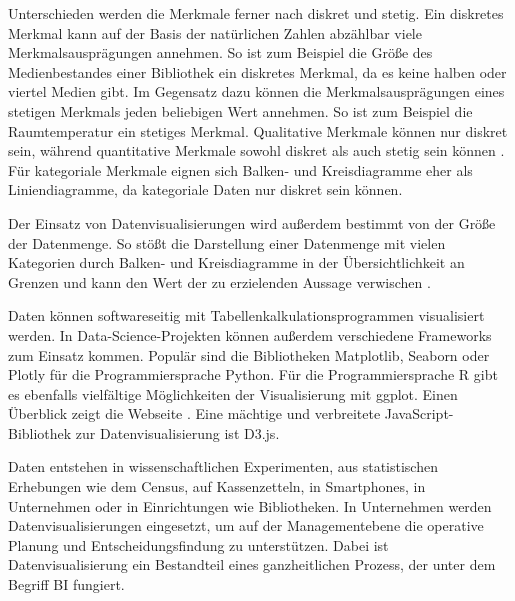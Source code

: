 Unterschieden werden die Merkmale ferner nach diskret und stetig.
Ein diskretes Merkmal kann auf der Basis der natürlichen Zahlen abzählbar viele Merkmalsausprägungen annehmen.
So ist zum Beispiel die Größe des Medienbestandes einer Bibliothek ein diskretes Merkmal, da es keine halben oder viertel Medien gibt.
Im Gegensatz dazu können die Merkmalsausprägungen eines stetigen Merkmals jeden beliebigen Wert annehmen. So ist zum Beispiel die Raumtemperatur ein stetiges Merkmal.
Qualitative Merkmale können nur diskret sein, während quantitative Merkmale sowohl diskret als auch stetig sein können \cite[vgl.][102 f.]{kirk_data_2019}. 
Für kategoriale Merkmale eignen sich Balken- und Kreisdiagramme eher als Liniendiagramme, da kategoriale Daten nur diskret sein können.

Der Einsatz von Datenvisualisierungen wird außerdem bestimmt von der Größe der Datenmenge.
So stößt die Darstellung einer Datenmenge mit vielen Kategorien durch Balken- und Kreisdiagramme 
in der Übersichtlichkeit an Grenzen und kann den Wert der zu erzielenden Aussage verwischen \cite[Vgl.][5 ff.]{few_show_2012}. 

Daten können softwareseitig mit Tabellenkalkulationsprogrammen visualisiert werden.
In Data-Science-Projekten können außerdem verschiedene Frameworks zum Einsatz kommen. Populär sind die Bibliotheken Matplotlib, Seaborn oder Plotly für 
die Programmiersprache Python. Für die Programmiersprache R gibt es ebenfalls vielfältige Möglichkeiten der Visualisierung mit
ggplot. Einen Überblick zeigt die Webseite \cite{witherley_chartmaker_2020}.
Eine mächtige und verbreitete JavaScript-Bibliothek zur Datenvisualisierung ist D3.js.


Daten entstehen in wissenschaftlichen Experimenten, aus statistischen Erhebungen wie 
dem Census, auf Kassenzetteln, in Smartphones, in Unternehmen oder in Einrichtungen wie Bibliotheken. 
In Unternehmen werden Datenvisualisierungen eingesetzt, um auf der Managementebene die operative Planung und Entscheidungsfindung zu unterstützen.
Dabei ist Datenvisualisierung ein Bestandteil eines ganzheitlichen Prozess, der unter dem Begriff \acrfull{BI} fungiert. 


